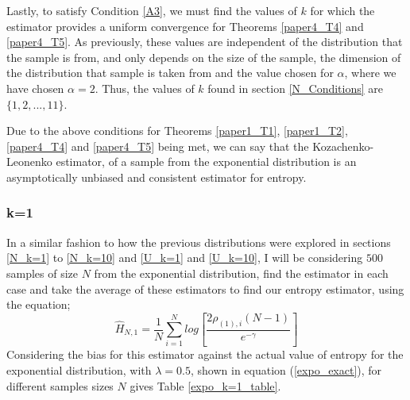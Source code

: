 \documentclass{article}
\begin{document}
Lastly, to satisfy Condition \ref{A3}, we must find the values of $k$ for which the estimator provides a uniform convergence for Theorems \ref{paper4_T4} and \ref{paper4_T5}. As previously, these values are independent of the distribution that the sample is from, and only depends on the size of the sample, the dimension of the distribution that sample is taken from and the value chosen for $\alpha$, where we have chosen $\alpha = 2$. Thus, the values of $k$ found in section \ref{N_Conditions} are $\{1, 2, ..., 11\}$.

Due to the above conditions for Theorems \ref{paper1_T1}, \ref{paper1_T2}, \ref{paper4_T4} and \ref{paper4_T5} being met, we can say that the Kozachenko-Leonenko estimator, of a sample from the exponential distribution is an asymptotically unbiased and consistent estimator for entropy. 




\subsubsection{k=1} \label{E_k=1}
In a similar fashion to how the previous distributions were explored in sections \ref{N_k=1} to \ref{N_k=10} and \ref{U_k=1} and \ref{U_k=10}, I will be considering $500$ samples of size $N$ from the exponential distribution, find the estimator in each case and take the average of these estimators to find our entropy estimator, using the equation;
\begin{equation}
\hat{H}_{N, 1} = \frac{1}{N} \sum_{i=1}^{N} log \left[ \frac{2\rho_{(1),i} (N-1)}{e^{-\gamma}} \right] \nonumber
\end{equation}
Considering the bias for this estimator against the actual value of entropy for the exponential distribution, with $\lambda =0.5$, shown in equation (\ref{expo_exact}), for different samples sizes $N$ gives Table \ref{expo_k=1_table}.
\end{document}
